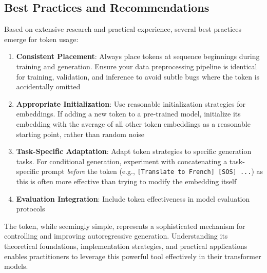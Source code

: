 \subsection{Best Practices and Recommendations}

Based on extensive research and practical experience, several best practices emerge for \sos{} token usage:

\begin{enumerate}
\item \textbf{Consistent Placement}: Always place \sos{} tokens at sequence beginnings during training and generation. Ensure your data preprocessing pipeline is identical for training, validation, and inference to avoid subtle bugs where the \sos{} token is accidentally omitted
\item \textbf{Appropriate Initialization}: Use reasonable initialization strategies for \sos{} embeddings. If adding a new \sos{} token to a pre-trained model, initialize its embedding with the average of all other token embeddings as a reasonable starting point, rather than random noise
\item \textbf{Task-Specific Adaptation}: Adapt \sos{} token strategies to specific generation tasks. For conditional generation, experiment with concatenating a task-specific prompt \emph{before} the \sos{} token (e.g., \texttt{[Translate to French] [SOS] ...}) as this is often more effective than trying to modify the \sos{} embedding itself
\item \textbf{Evaluation Integration}: Include \sos{} token effectiveness in model evaluation protocols
\end{enumerate}

The \sos{} token, while seemingly simple, represents a sophisticated mechanism for controlling and improving autoregressive generation. Understanding its theoretical foundations, implementation strategies, and practical applications enables practitioners to leverage this powerful tool effectively in their transformer models.